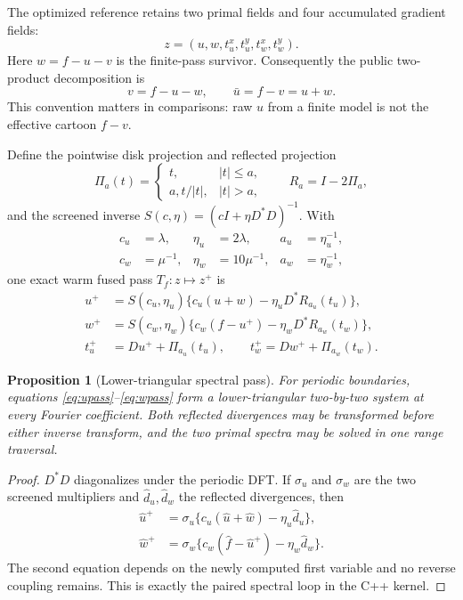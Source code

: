 \documentclass[10pt,twocolumn]{article}
\newtheorem{proposition}{Proposition}[section]
\theoremstyle{definition}\newtheorem{remark}[proposition]{Remark}
\newcommand{\PiD}{\Pi}
\newcommand{\Tf}{T_f}
\begin{document}
The optimized reference retains two primal fields and four accumulated
gradient fields:
\begin{equation}
z=(u,w,t_u^x,t_u^y,t_w^x,t_w^y).
\label{eq:state}
\end{equation}
Here $w=f-u-v$ is the finite-pass survivor.  Consequently the public
two-product decomposition is
\begin{equation}
v=f-u-w,\qquad \bar u=f-v=u+w.
\label{eq:effective}
\end{equation}
This convention matters in comparisons: raw $u$ from a finite model is not
the effective cartoon $f-v$.

Define the pointwise disk projection and reflected projection
\begin{equation}
\PiD_a(t)=\begin{cases}t,&|t|\le a,\\a,t/|t|,&|t|>a,
\end{cases}\qquad R_a=I-2\PiD_a,
\label{eq:projection}
\end{equation}
and the screened inverse $S(c,\eta)=(cI+\eta D^*D)^{-1}$.  With
\begin{align}
c_u&=\lambda,&\eta_u&=2\lambda,&a_u&=\eta_u^{-1},\nonumber\\
c_w&=\mu^{-1},&\eta_w&=10\mu^{-1},&a_w&=\eta_w^{-1},
\end{align}
one exact warm fused pass $\Tf:z\mapsto z^+$ is
\begin{align}
u^+&=S(c_u,\eta_u)
 \{c_u(u+w)-\eta_uD^*R_{a_u}(t_u)\},\label{eq:upass}\\
w^+&=S(c_w,\eta_w)
 \{c_w(f-u^+)-\eta_wD^*R_{a_w}(t_w)\},\label{eq:wpass}\\
t_u^+&=Du^++\PiD_{a_u}(t_u),\qquad
t_w^+=Dw^++\PiD_{a_w}(t_w).\label{eq:tpass}
\end{align}

\begin{proposition}[Lower-triangular spectral pass]
For periodic boundaries, equations \eqref{eq:upass}--\eqref{eq:wpass} form a
lower-triangular two-by-two system at every Fourier coefficient.  Both
reflected divergences may be transformed before either inverse transform,
and the two primal spectra may be solved in one range traversal.
\end{proposition}
\begin{proof}
$D^*D$ diagonalizes under the periodic DFT.  If $\sigma_u$ and $\sigma_w$
are the two screened multipliers and $\widehat d_u,\widehat d_w$ the reflected
divergences, then
\begin{align*}
\widehat u^+&=\sigma_u\{c_u(\widehat u+\widehat w)
-\eta_u\widehat d_u\},\\
\widehat w^+&=\sigma_w\{c_w(\widehat f-\widehat u^+)
-\eta_w\widehat d_w\}.
\end{align*}
The second equation depends on the newly computed first variable and no
reverse coupling remains.  This is exactly the paired spectral loop in the
C++ kernel.
\end{proof}
\end{document}
